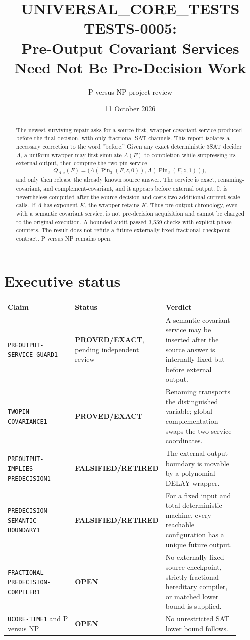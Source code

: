 \documentclass[11pt]{article}
\title{UNIVERSAL\_CORE\_TESTS TESTS-0005:\\
Pre-Output Covariant Services Need Not Be Pre-Decision Work}
\author{P versus NP project review}
\date{11 October 2026}
\newcommand{\EXACT}{\textbf{PROVED/EXACT}}
\newcommand{\OPEN}{\textbf{OPEN}}
\newcommand{\RETIRED}{\textbf{FALSIFIED/RETIRED}}
\begin{document}
\maketitle

\begin{abstract}
The newest surviving repair asks for a source-first, wrapper-covariant service
produced before the final decision, with only fractional SAT channels.  This
report isolates a necessary correction to the word ``before.''  Given any
exact deterministic 3SAT decider $A$, a uniform wrapper may first simulate
$A(F)$ to completion while suppressing its external output, then compute the
two-pin service
\[
 Q_{A,z}(F)=\bigl(A(\operatorname{Pin}_3(F,z,0)),
                  A(\operatorname{Pin}_3(F,z,1))\bigr),
\]
and only then release the already known source answer.  The service is exact,
renaming-covariant, and complement-covariant, and it appears before external
output.  It is nevertheless computed after the source decision and costs two
additional current-scale calls.  If $A$ has exponent $K$, the wrapper retains
$K$.  Thus pre-output chronology, even with a semantic covariant service, is
not pre-decision acquisition and cannot be charged to the original execution.
A bounded audit passed 3,559 checks with explicit phase counters.  The result
does not refute a future externally fixed fractional checkpoint contract.
P versus NP remains open.
\end{abstract}

\section{Executive status}

\begin{center}
\small
\begin{tabular}{p{0.35\linewidth}p{0.20\linewidth}p{0.37\linewidth}}
\toprule
Claim & Status & Verdict\\
\midrule
\texttt{PREOUTPUT-SERVICE-GUARD1} & \EXACT, pending independent review &
A semantic covariant service may be inserted after the source answer is
internally fixed but before external output.\\
\texttt{TWOPIN-COVARIANCE1} & \EXACT &
Renaming transports the distinguished variable; global complementation swaps
the two service coordinates.\\
\texttt{PREOUTPUT-IMPLIES-PREDECISION1} & \RETIRED &
The external output boundary is movable by a polynomial DELAY wrapper.\\
\texttt{PREDECISION-SEMANTIC-BOUNDARY1} & \RETIRED &
For a fixed input and total deterministic machine, every reachable
configuration has a unique future output.\\
\texttt{FRACTIONAL-PREDECISION-COMPILER1} & \OPEN &
No externally fixed source checkpoint, strictly fractional hereditary
compiler, or matched lower bound is supplied.\\
\texttt{UCORE-TIME1} and P versus NP & \OPEN &
No unrestricted SAT lower bound follows.\\
\bottomrule
\end{tabular}
\end{center}
\end{document}
